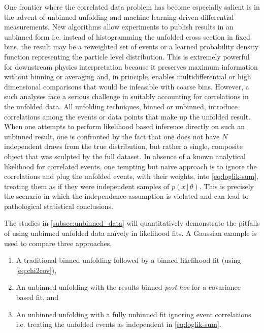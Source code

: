     One frontier where the correlated data problem has become especially salient is in the advent of unbinned unfolding and machine learning driven differential measurements.
    New algorithms allow experiments to publish results in an unbinned form i.e. instead of histogramming the unfolded cross section in fixed bins, the result may be a reweighted set of events or a learned probability density function representing the particle level distribution.
    This is extremely powerful for downstream physics interpretation because it preserves maximum information without binning or averaging and, in principle, enables multidifferential or high dimensional comparisons that would be infeasible with coarse bins.
    However, a such analyses face a serious challenge in suitably accounting for correlations in the unfolded data.
    All unfolding techniques, binned or unbinned, introduce correlations among the events or data points that make up the unfolded result.
    When one attempts to perform likelihood based inference directly on such an unbinned result, one is confronted by the fact that one does not have $N$ independent draws from the true distribution, but rather a single, composite object that was sculpted by the full dataset.
    In absence of a known analytical likelihood for correlated events, one tempting but na\"ive approach is to ignore the correlations and plug the unfolded events, with their weights, into \cref{eq:loglik-sum}, treating them as if they were independent samples of $p(x\,|\,\theta)$.
    This is precisely the scenario in which the independence assumption is violated and can lead to pathological statistical conclusions.

    The studies in \cref{subsec:unbinned_data} will quantitatively demonstrate the pitfalls of using unbinned unfolded data naïvely in likelihood fits.
    A Gaussian example is used to compare three approaches,
    \begin{enumerate}
        \item A traditional binned unfolding followed by a binned likelihood fit (using \cref{eq:chi2cov}),
        \item An unbinned unfolding with the results binned \textit{post hoc} for a covariance based fit, and
        \item An unbinned unfolding with a fully unbinned fit ignoring event correlations i.e. treating the unfolded events as independent in \cref{eq:loglik-sum}.
    \end{enumerate}
    
